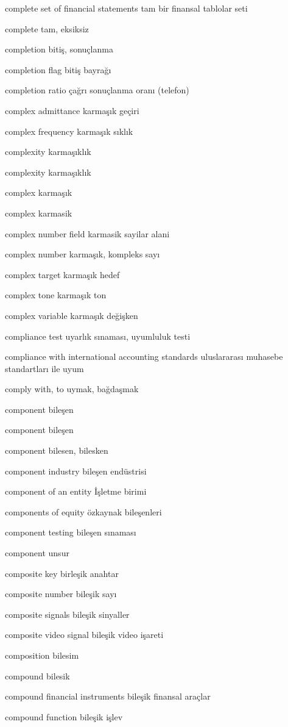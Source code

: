 \documentclass[12pt,fleqn]{article}\usepackage{../../common}
\begin{document}
complete set of financial statements tam bir finansal tablolar seti

complete tam, eksiksiz

completion bitiş, sonuçlanma

completion flag bitiş bayrağı

completion ratio çağrı sonuçlanma oranı (telefon)

complex admittance karmaşık geçiri

complex frequency karmaşık sıklık

complexity karmaşıklık

complexity karmaşıklık

complex karmaşık

complex karmasik

complex number field karmasik sayilar alani

complex number karmaşık, kompleks sayı

complex target karmaşık hedef

complex tone karmaşık ton

complex variable karmaşık değişken

compliance test uyarlık sınaması, uyumluluk testi

compliance with international accounting standards uluslararası muhasebe standartları ile uyum

comply with, to uymak, bağdaşmak

component bileşen

component bileşen

component bilesen, bilesken

component industry bileşen endüstrisi

component of an entity İşletme birimi

components of equity özkaynak bileşenleri

component testing bileşen sınaması

component unsur

composite key birleşik anahtar

composite number bileşik sayı

composite signals bileşik sinyaller

composite video signal bileşik video işareti

composition bilesim

compound bilesik

compound financial instruments bileşik finansal araçlar

compound function bileşik işlev
\end{document}

